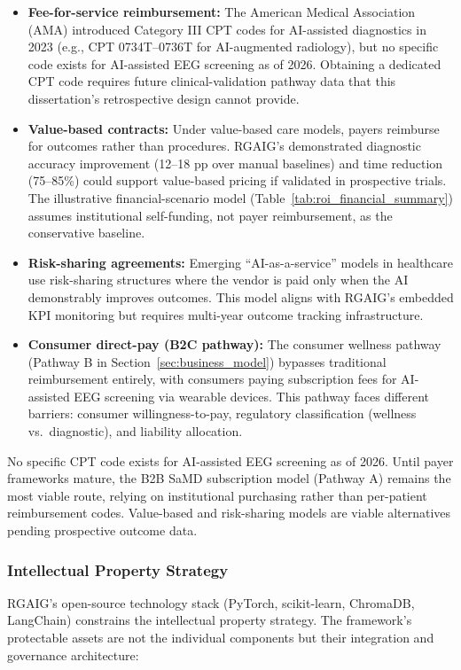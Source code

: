 \begin{itemize}
    \item \textbf{Fee-for-service reimbursement:} The American Medical Association (AMA) introduced Category III CPT codes for AI-assisted diagnostics in 2023 (e.g., CPT 0734T--0736T for AI-augmented radiology), but no specific code exists for AI-assisted EEG screening as of 2026. Obtaining a dedicated CPT code requires future clinical-validation pathway data that this dissertation's retrospective design cannot provide.
    \item \textbf{Value-based contracts:} Under value-based care models, payers reimburse for outcomes rather than procedures. RGAIG's demonstrated diagnostic accuracy improvement (12--18 pp over manual baselines) and time reduction (75--85\%) could support value-based pricing if validated in prospective trials. The illustrative financial-scenario model (Table~\ref{tab:roi_financial_summary}) assumes institutional self-funding, not payer reimbursement, as the conservative baseline.
    \item \textbf{Risk-sharing agreements:} Emerging ``AI-as-a-service'' models in healthcare use risk-sharing structures where the vendor is paid only when the AI demonstrably improves outcomes. This model aligns with RGAIG's embedded KPI monitoring but requires multi-year outcome tracking infrastructure.
    \item \textbf{Consumer direct-pay (B2C pathway):} The consumer wellness pathway (Pathway B in Section~\ref{sec:business_model}) bypasses traditional reimbursement entirely, with consumers paying subscription fees for AI-assisted EEG screening via wearable devices. This pathway faces different barriers: consumer willingness-to-pay, regulatory classification (wellness vs.\ diagnostic), and liability allocation.
\end{itemize}
\fi
\noindent No specific CPT code exists for AI-assisted EEG screening as of 2026. Until payer frameworks mature, the B2B SaMD subscription model (Pathway A) remains the most viable route, relying on institutional purchasing rather than per-patient reimbursement codes. Value-based and risk-sharing models are viable alternatives pending prospective outcome data.

\subsubsection{Intellectual Property Strategy}

\iffalse
RGAIG's open-source technology stack (PyTorch, scikit-learn, ChromaDB, LangChain) constrains the intellectual property strategy. The framework's protectable assets are not the individual components but their integration and governance architecture:

